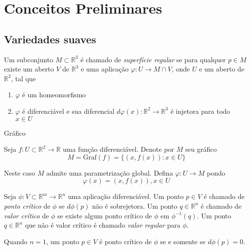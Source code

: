 \chapter{Conceitos Preliminares}

\section{Variedades suaves}

\begin{defi}
Um subconjunto $M \subset \mathbb{R}^3$ é chamado de \emph{superfície regular} se para qualquer $p \in M$ existe um aberto $V$ de $\mathbb{R}^3$ e uma aplicação $\varphi: U \rightarrow M \cap V$, onde $U$ e um aberto de $\mathbb{R}^2$, tal que
\begin{enumerate}
    \item $\varphi$ é um homeomorfismo
    \item $\varphi$ é diferenciável e sua diferencial $d\varphi(x): \mathbb{R}^2 \rightarrow \mathbb{R}^3$ é injetora para todo $x \in U$
\end{enumerate}
\end{defi}

Gráfico

\begin{exemplo}
Seja $f: U \subset \mathbb{R}^2 \rightarrow \mathbb{R}$ uma função diferenciável. Denote por $M$ seu gráfico
\begin{equation*}
    M = \text{Graf}(f) = \{ (x,f(x)): x \in U \}
\end{equation*}

Neste caso $M$ admite uma parametrização global. Defina $\varphi: U \rightarrow M$ pondo
\begin{equation*}
    \varphi(x) = (x,f(x)), x \in U
\end{equation*}
\end{exemplo}

\begin{defi}
Seja $\phi: V \subset \mathbb{R}^m \rightarrow \mathbb{R}^n$ uma aplicação diferenciável. Um ponto $p \in V$ é chamado de \emph{ponto crítico} de $\phi$ se $d\phi(p)$ não é sobrejetora. Um ponto $q \in \mathbb{R}^n$ é chamado de \emph{valor crítico} de $\phi$ se existe algum ponto crítico de $\phi$ em $\phi^{-1}(q)$. Um ponto $q \in \mathbb{R}^n$ que não é valor crítico é chamado \emph{valor regular} para $\phi$.
\end{defi}

\begin{obs}
Quando $n=1$, um ponto $p \in V$ é ponto crítico de $\phi$ se e somente se $d\phi(p)=0$.
\end{obs}

